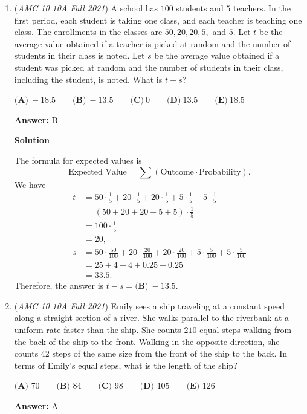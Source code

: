 \begin{enumerate}
	\item (\textit{AMC 10 10A Fall 2021}) A school has $100$ students and $5$ teachers. In the first period, each student is taking one class, and each teacher is teaching one class. The enrollments in the classes are $50, 20, 20, 5,$ and $5$. Let $t$ be the average value obtained if a teacher is picked at random and the number of students in their class is noted. Let $s$ be the average value obtained if a student was picked at random and the number of students in their class, including the student, is noted. What is $t-s$?


 $\textbf{(A)}\ {-}18.5  \qquad\textbf{(B)}\ {-}13.5 \qquad\textbf{(C)}\ 0 \qquad\textbf{(D)}\ 13.5 \qquad\textbf{(E)}\ 18.5$

 \textbf{Answer: }B



\textbf{Solution}

The formula for expected values is 
 \[\text{Expected Value}=\sum(\text{Outcome}\cdot\text{Probability}).\]We have
 \begin{align*} t &= 50\cdot\frac15 + 20\cdot\frac15 + 20\cdot\frac15 + 5\cdot\frac15 + 5\cdot\frac15 \\ &= (50+20+20+5+5)\cdot\frac15 \\ &= 100\cdot\frac15 \\ &= 20, \\ s &= 50\cdot\frac{50}{100} + 20\cdot\frac{20}{100} + 20\cdot\frac{20}{100} + 5\cdot\frac{5}{100} + 5\cdot\frac{5}{100} \\ &= 25 + 4 + 4 + 0.25 + 0.25 \\ &= 33.5. \end{align*}
Therefore, the answer is $t-s=\boxed{\textbf{(B)}\ {-}13.5}.$



	\item (\textit{AMC 10 10A Fall 2021}) Emily sees a ship traveling at a constant speed along a straight section of a river. She walks parallel to the riverbank at a uniform rate faster than the ship. She counts $210$ equal steps walking from the back of the ship to the front. Walking in the opposite direction, she counts $42$ steps of the same size from the front of the ship to the back. In terms of Emily's equal steps, what is the length of the ship?


 $\textbf{(A) }70\qquad\textbf{(B) }84\qquad\textbf{(C) }98\qquad\textbf{(D) }105\qquad\textbf{(E) }126$

 \textbf{Answer: }A




\end{enumerate}
